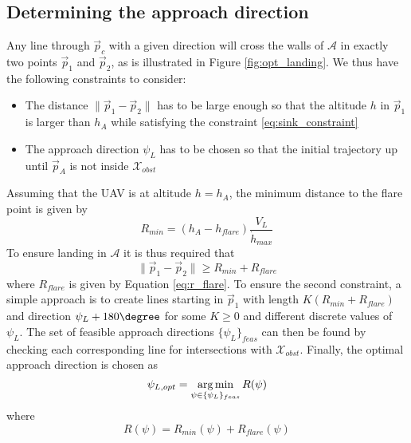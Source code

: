 \subsection{Determining the approach direction}
Any line through $\vec{p}_c$ with a given direction will cross the walls of $\mathcal{A}$ in exactly two points $\vec{p}_1$ and $\vec{p}_2$, as is illustrated in Figure \ref{fig:opt_landing}. 
We thus have the following constraints to consider:
\begin{itemize}
    \item The distance $\|\vec{p}_1-\vec{p}_2\|$ has to be large enough so that the altitude $h$ in $\vec{p}_1$ is larger than $h_A$ while satisfying 
    the constraint \eqref{eq:sink_constraint}
    \item The approach direction $\psi_L$ has to be chosen so that the initial trajectory up until $\vec{p}_A$ is not inside $\mathcal{X}_{obst}$
\end{itemize}
Assuming that the UAV is at altitude $h=h_A$, the minimum distance to the flare point is given by
\begin{equation}
    R_{min}=(h_A-h_{flare})\frac{V_L}{\dot{h}_{max}}
\end{equation}
To ensure landing in $\mathcal{A}$ it is thus required that 
\begin{equation}
    \|\vec{p}_1-\vec{p}_2\|\geq R_{min}+R_{flare}
\end{equation}
where $R_{flare}$ is given by Equation \eqref{eq:r_flare}. To ensure the second constraint, a simple approach is to 
create lines starting in $\vec{p}_1$ with length $K(R_{min}+R_{flare})$ and direction $\psi_L+180\degree$ for some $K\geq0$ and different discrete values of $\psi_L$. 
The set of feasible approach directions $\{\psi_{L}\}_{feas}$ can then be found by checking each corresponding line for intersections with $\mathcal{X}_{obst}$. Finally, the optimal approach direction is 
chosen as 
\begin{equation}
    \psi_{L,opt} = \operatorname*{arg\,min}_{\psi\in\{\psi_{L}\}_{feas}}R(\psi)
\end{equation}
where
\begin{equation}
    R(\psi)=R_{min}(\psi) + R_{flare}(\psi)
\end{equation}

